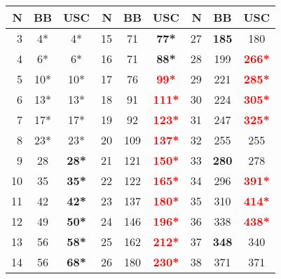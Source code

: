 \begin{table}[t]\scriptsize
\begin{tabular}{r|c|c||r|c|c||r|c|c}
 \hline
 N&BB &USC&N&BB&USC&N&BB&USC\\
 \hline
 3&4*&4*&    15&71&\textbf{77*}&
 27&\textbf{185}&180 \\
 4&6*&6*&    16&71&\textbf{88*}&
 28&199&\textbf{\textcolor{red}{266*}} \\
 5&10*&10*&    17&76&\textbf{\textcolor{red}{99*}}&
 29&221&\textbf{\textcolor{red}{285*}} \\
 6&13*&13*&    18&91&\textbf{\textcolor{red}{111*}}&
 30&224&\textbf{\textcolor{red}{305*}} \\
 7&17*&17*&    19&92&\textbf{\textcolor{red}{123*}}&
 31&247&\textbf{\textcolor{red}{325*}} \\
 8&23*&23*&    20&109&\textbf{\textcolor{red}{137*}}&
 32&255&255 \\
 9&28&\textbf{28*}&    21&121&\textbf{\textcolor{red}{150*}}&
 33&\textbf{280}&278 \\
 10&35&\textbf{35*}&    22&122&\textbf{\textcolor{red}{165*}}&
 34&296&\textbf{\textcolor{red}{391*}} \\
 11&42&\textbf{42*}&    23&137&\textbf{\textcolor{red}{180*}}&
 35&310&\textbf{\textcolor{red}{414*}} \\
 12&49&\textbf{50*}&    24&146&\textbf{\textcolor{red}{196*}}&
 36&338&\textbf{\textcolor{red}{438*}} \\
 13&56&\textbf{58*}&    25&162&\textbf{\textcolor{red}{212*}}&
 37&\textbf{348}&340 \\
 14&56&\textbf{68*}&    26&180&\textbf{\textcolor{red}{230*}}&
 38&371&371 \\ 
\end{tabular}
\end{table}
